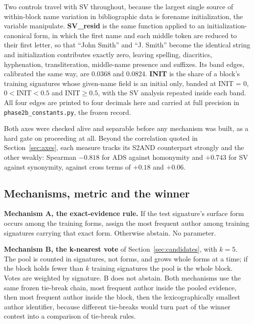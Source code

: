 \documentclass[11pt]{article}
\begin{document}
Two controls travel with SV throughout, because the largest single source of
within-block name variation in bibliographic data is forename initialization,
the variable \citet{kimkim2020} manipulate. \textbf{SV\_resid} is the same
function applied to an initialization-canonical form, in which the first name
and each middle token are reduced to their first letter, so that ``John
Smith'' and ``J. Smith'' become the identical string and initialization
contributes exactly zero, leaving spelling, diacritics, hyphenation,
transliteration, middle-name presence and suffixes. Its band edges, calibrated
the same way, are 0.0368 and 0.0824. \textbf{INIT} is the share of a block's
training signatures whose given-name field is an initial only, banded at
INIT = 0, $0 < \mathrm{INIT} < 0.5$ and $\mathrm{INIT} \geq 0.5$, with the SV
analysis repeated inside each band. All four edges are printed to four
decimals here and carried at full precision in
\texttt{phase2b\_constants.py}, the frozen record.

Both axes were checked alive and separable before any mechanism was built, as
a hard gate on proceeding at all. Beyond the correlation quoted in
Section~\ref{sec:axes}, each measure tracks its S2AND counterpart strongly and
the other weakly: Spearman $-0.818$ for ADS against homonymity and $+0.743$
for SV against synonymity, against cross terms of $+0.18$ and $+0.06$.

\subsection{Mechanisms, metric and the winner}
\label{sec:winner-construct}

\textbf{Mechanism A, the exact-evidence rule.} If the test signature's surface
form occurs among the training forms, assign the most frequent author among
training signatures carrying that exact form. Otherwise abstain. No parameter.

\textbf{Mechanism B, the k-nearest vote} of Section~\ref{sec:candidates}, with
$k = 5$. The pool is counted in signatures, not forms, and grows whole forms
at a time; if the block holds fewer than $k$ training signatures the pool is
the whole block. Votes are weighted by signature. B does not abstain. Both
mechanisms use the same frozen tie-break chain, most frequent author inside
the pooled evidence, then most frequent author inside the block, then the
lexicographically smallest author identifier, because different tie-breaks
would turn part of the winner contest into a comparison of tie-break rules.
\end{document}
